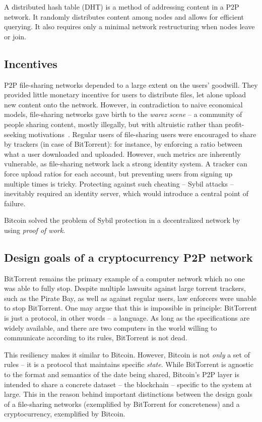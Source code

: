 A distributed hash table (DHT) is a method of addressing content in a P2P network.
It randomly distributes content among nodes and allows for efficient querying.
It also requires only a minimal network restructuring when nodes leave or join.


\subsection{Incentives}

P2P file-sharing networks depended to a large extent on the users' goodwill.
They provided little monetary incentive for users to distribute files, let alone upload new content onto the network.
However, in contradiction to naive economical models, file-sharing networks gave birth to the \textit{warez scene} -- a community of people sharing content, mostly illegally, but with altruistic rather than profit-seeking motivations~\cite{Rehn2004}.
Regular users of file-sharing users were encouraged to share by trackers (in case of BitTorrent): for instance, by enforcing a ratio between what a user downloaded and uploaded.
However, such metrics are inherently vulnerable, as file-sharing network lack a strong identity system.
A tracker can force upload ratios for each account, but preventing users from signing up multiple times is tricky.
Protecting against such cheating -- Sybil attacks -- inevitably required an identity server, which would introduce a central point of failure.

Bitcoin solved the problem of Sybil protection in a decentralized network by using \textit{proof of work}.


\subsection{Design goals of a cryptocurrency P2P network}

BitTorrent remains the primary example of a computer network which no one was able to fully stop.
Despite multiple lawsuits against large torrent trackers, such as the Pirate Bay, as well as against regular users, law enforcers were unable to stop BitTorrent.
One may argue that this is impossible in principle: BitTorrent is just a protocol, in other words -- a language.
As long as the specifications are widely available, and there are two computers in the world willing to communicate according to its rules, BitTorrent is not dead.

This resiliency makes it similar to Bitcoin.
However, Bitcoin is not \textit{only} a set of rules -- it is a protocol that maintains specific \textit{state}.
While BitTorrent is agnostic to the format and semantics of the date being shared, Bitcoin's P2P layer is intended to share a concrete dataset -- the blockchain -- specific to the system at large.
This in the reason behind important distinctions between the design goals of a file-sharing networks (exemplified by BitTorrent for concreteness) and a cryptocurrency, exemplified by Bitcoin.


